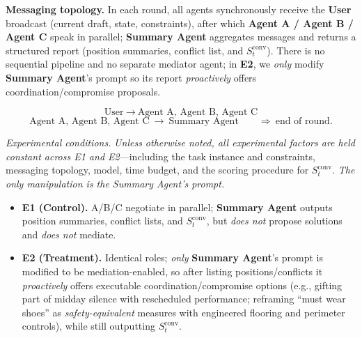 \textbf{Messaging topology.}
In each round, all agents synchronously receive the \textbf{User} broadcast (current draft, state, constraints), after which \textbf{Agent A / Agent B / Agent C} speak in parallel; \textbf{Summary Agent} aggregates messages and returns a structured report (position summaries, conflict list, and $S_t^{\mathrm{conv}}$). There is no sequential pipeline and no separate mediator agent; in \textbf{E2}, we \emph{only} modify \textbf{Summary Agent}'s prompt so its report \emph{proactively} offers coordination/compromise proposals.


\[
\text{User}\ \rightarrow\ \text{Agent A, \ Agent B, \ Agent C}
\]
\[
\text{Agent A, \ Agent B, \ Agent C}\ \rightarrow\ \text{Summary Agent} \qquad\Rightarrow\ \text{end of round}.
\]



\emph{Experimental conditions.}
\emph{Unless otherwise noted, all experimental factors are held constant across E1 and E2}—including the task instance and constraints, messaging topology, model, time budget, and the scoring procedure for \(S_t^{\mathrm{conv}}\). \emph{The only manipulation is the Summary Agent’s prompt.}

\begin{itemize}
\item \textbf{E1 (Control).} A/B/C negotiate in parallel; \textbf{Summary Agent} outputs position summaries, conflict lists, and $S_t^{\mathrm{conv}}$, but \emph{does not} propose solutions and \emph{does not} mediate.
\item \textbf{E2 (Treatment).} Identical roles; \emph{only} \textbf{Summary Agent}'s prompt is modified to be mediation-enabled, so after listing positions/conflicts it \emph{proactively} offers executable coordination/compromise options (e.g., gifting part of midday silence with rescheduled performance; reframing ``must wear shoes'' as \emph{safety-equivalent} measures with engineered flooring and perimeter controls), while still outputting $S_t^{\mathrm{conv}}$.
\end{itemize}

